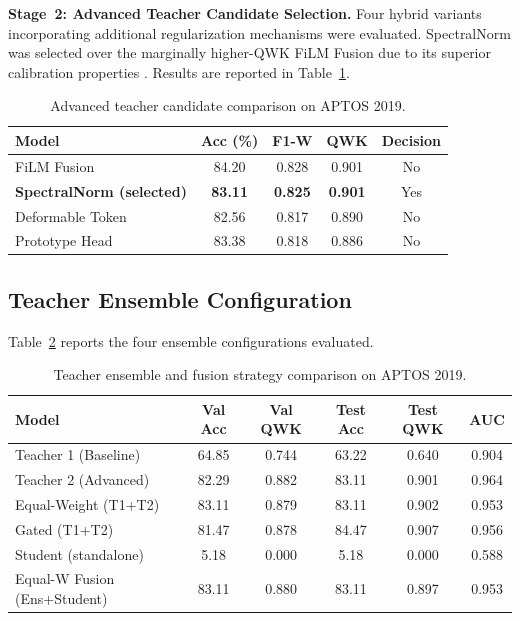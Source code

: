 \documentclass[a4paper,fleqn]{cas-dc}
\begin{document}
\textbf{Stage~2: Advanced Teacher Candidate Selection.} Four hybrid variants incorporating additional regularization mechanisms were evaluated. SpectralNorm was selected over the marginally higher-QWK FiLM Fusion due to its superior calibration properties \cite{miyato2018}. Results are reported in Table~\ref{tab:advanced}.

\begin{table}[t]
\centering
\caption{Advanced teacher candidate comparison on APTOS 2019.}
\label{tab:advanced}
\small
\begin{tabular}{lcccc}
\toprule
Model & Acc (\%) & F1-W & QWK & Decision \\
\midrule
FiLM Fusion & 84.20 & 0.828 & 0.901 & No \\
\textbf{SpectralNorm (selected)} & \textbf{83.11} & \textbf{0.825} & \textbf{0.901} & Yes \\
Deformable Token & 82.56 & 0.817 & 0.890 & No \\
Prototype Head & 83.38 & 0.818 & 0.886 & No \\
\bottomrule
\end{tabular}
\end{table}

\subsection{Teacher Ensemble Configuration}
\label{sec:teacher_ensemble}

Table~\ref{tab:ensemble} reports the four ensemble configurations evaluated.

\begin{table}[t]
\centering
\caption{Teacher ensemble and fusion strategy comparison on APTOS 2019.}
\label{tab:ensemble}
\small
\begin{tabular}{lccccc}
\toprule
Model & Val Acc & Val QWK & Test Acc & Test QWK & AUC \\
\midrule
Teacher 1 (Baseline) & 64.85 & 0.744 & 63.22 & 0.640 & 0.904 \\
Teacher 2 (Advanced) & 82.29 & 0.882 & 83.11 & 0.901 & 0.964 \\
Equal-Weight (T1+T2) & 83.11 & 0.879 & 83.11 & 0.902 & 0.953 \\
Gated (T1+T2) & 81.47 & 0.878 & 84.47 & 0.907 & 0.956 \\
Student (standalone) & 5.18 & 0.000 & 5.18 & 0.000 & 0.588 \\
Equal-W Fusion (Ens+Student) & 83.11 & 0.880 & 83.11 & 0.897 & 0.953 \\
\bottomrule
\end{tabular}
\end{table}
\end{document}
